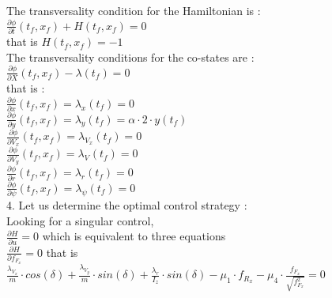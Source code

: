\documentclass{article}
\begin{document}
The transversality condition for the Hamiltonian is : \\

$\frac{\partial \phi}{\partial t}(t_{f},x_{f}) + H(t_{f},x_{f}) = 0$\\

that is $H(t_{f},x_{f}) = -1$\\

The transversality conditions for the co-states are : \\

$\frac{\partial \phi}{\partial X}(t_{f},x_{f}) - \lambda(t_{f}) = 0$\\

that is :\\

$\frac{\partial \phi}{\partial x}(t_{f},x_{f}) = \lambda_{x}(t_{f}) = 0$\\

$\frac{\partial \phi}{\partial y}(t_{f},x_{f})  = \lambda_{y}(t_{f}) = \alpha \cdot 2 \cdot y(t_{f}) $\\

$\frac{\partial \phi}{\partial V_{x}}(t_{f},x_{f}) = \lambda_{V_{x}}(t_{f}) = 0$\\

$\frac{\partial \phi}{\partial V_{y}}(t_{f},x_{f}) = \lambda_{V_{}}(t_{f}) = 0$\\

$\frac{\partial \phi}{\partial r}(t_{f},x_{f}) = \lambda_{r}(t_{f}) = 0$\\

$\frac{\partial \phi}{\partial \psi}(t_{f},x_{f}) = \lambda_{\psi}(t_{f}) = 0$\\

4. Let us determine the optimal control strategy : \\

Looking for a singular control, \\

$\frac{\partial H}{\partial u} = 0$ which is equivalent to three equations \\

$\frac{\partial H}{\partial f_{F_{x}}} = 0$ that is \\

$\frac{\lambda_{V_{x}}}{m} \cdot cos(\delta) + \frac{\lambda_{V_{y}}}{m} \cdot sin(\delta) + \frac{\lambda_{r}}{I_{z}} \cdot sin(\delta) - \mu_{1} \cdot f_{R_{x}}- \mu_{4} \cdot \frac{f_{F_{x}}}{\sqrt{f_{F_{x}}^2}} = 0$\\
\end{document}
